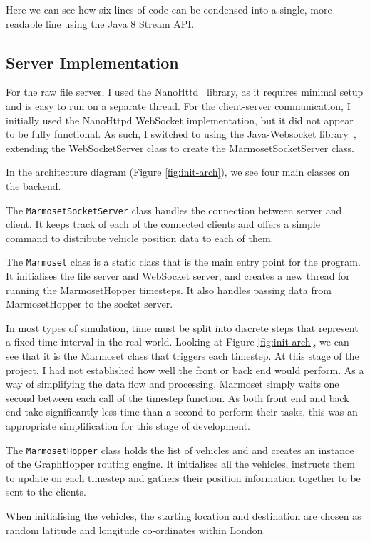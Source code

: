 \documentclass[ %
                    author={Alexander Hill},
                supervisor={Dr. Benjamin Sach},
                    degree={MEng},
                     title={MARMOSET},
                  subtitle={Multi-Agent Route Management using Online Simulation for Efficient Transportation},
                      type={research},
                      year={2016} ]{dissertation}
\begin{document}
Here we can see how six lines of code can be condensed into a single, more
readable line using the Java 8 Stream API.

\subsection{Server Implementation}

For the raw file server, I used the NanoHttd~\cite{nanohttpd} library, as it
requires minimal setup and is easy to run on a separate thread. For the
client-server communication, I initially used the NanoHttpd WebSocket
implementation, but it did not appear to be fully functional. As such, I
switched to using the Java-Websocket library~\cite{javawebsocket}, extending the
WebSocketServer class to create the MarmosetSocketServer class.

In the architecture diagram (Figure \ref{fig:init-arch}), we see four main
classes on the backend.

The \texttt{MarmosetSocketServer} class handles the connection between server
and client.  It keeps track of each of the connected clients and offers a simple
command to distribute vehicle position data to each of them.

The \texttt{Marmoset} class is a static class that is the main entry point for
the program. It initialises the file server and WebSocket server, and creates a
new thread for running the MarmosetHopper timesteps. It also handles passing
data from MarmosetHopper to the socket server.

In most types of simulation, time must be split into discrete steps that
represent a fixed time interval in the real world. Looking at Figure
\ref{fig:init-arch}, we can see that it is the Marmoset class that triggers each
timestep. At this stage of the project, I had not established how well the front
or back end would perform. As a way of simplifying the data flow and processing,
Marmoset simply waits one second between each call of the timestep function.  As
both front end and back end take significantly less time than a second to
perform their tasks, this was an appropriate simplification for this stage of
development.

The \texttt{MarmosetHopper} class holds the list of vehicles and and creates an
instance of the GraphHopper routing engine. It initialises all the vehicles,
instructs them to update on each timestep and gathers their position information
together to be sent to the clients.

When initialising the vehicles, the starting location and destination are chosen
as random latitude and longitude co-ordinates within London.
\end{document}
